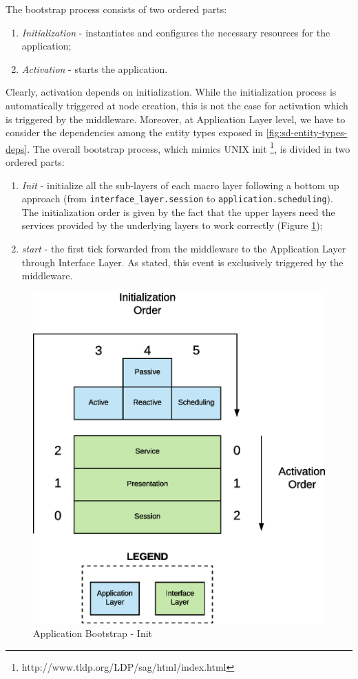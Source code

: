The bootstrap process consists of two ordered parts:
\begin{enumerate}
	\item \textit{Initialization} - instantiates and configures the necessary resources for the application;
	\item \textit{Activation} - starts the application.
\end{enumerate}
Clearly, activation depends on initialization.
While the initialization process is automatically triggered at node
creation, this is not the case for activation which is triggered by
the middleware.
Moreover, at Application Layer level, we have to consider the
dependencies among the entity types exposed in \ref{fig:sd-entity-types-deps}.
The overall bootstrap process, which mimics UNIX init
\footnote{http://www.tldp.org/LDP/sag/html/index.html},
is divided in two ordered parts:
\begin{enumerate}
	\item \textit{Init} - initialize all the sub-layers of each macro layer
	following a bottom up approach (from \verb|interface_layer.session| to
	\verb|application.scheduling|).
	The initialization order is given by the fact that the upper
	layers need the services provided by the underlying layers to work
	correctly (Figure \ref{fig:sd-app-init});
	\item \textit{start} - the first tick forwarded from the middleware to the
	Application Layer through Interface Layer. As stated, this event is
	exclusively triggered by the middleware.
\end{enumerate}
\begin{figure}[H]
  \centering
  \includegraphics[scale=0.5,keepaspectratio]
    {images/solution/init_activate.eps}
  \caption{Application Bootstrap - Init}
  \label{fig:sd-app-init}
\end{figure}


